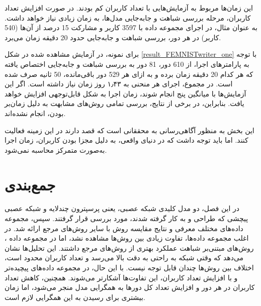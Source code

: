 این زمان‌ها مربوط به آزمایش‌هایی با تعداد کاربران کم بودند. در صورت افزایش تعداد کاربران، مرحله بررسی شباهت و جابه‌جایی مدل‌ها، به زمان زیادی نیاز خواهد داشت. به ‌عنوان مثال، در اجرای مجموعه داده
با 3597 کاربر و مشارکت 15 درصد از آن‌ها (540 کاربر) در هر دور، بررسی شباهت و جابه‌جایی حدود 20 دقیقه زمان می‌برد.

برای نمونه، در آزمایش مشاهده شده در شکل
\ref{result_FEMNISTwriter_one}
با توجه به پارامترهای اجرا، از 610 دور، 81 دور به بررسی شباهت و جابه‌جایی اختصاص یافته که هر کدام 20 دقیقه زمان برده و به ازای هر 529 دور باقی‌مانده، 50 ثانیه صرف شده است. در مجموع، اجرای هر منحنی به ۱٫۴۳ روز زمان نیاز داشته است. اگر این آزمایش‌ها با میانگین پنج
انجام شوند، زمان اجرا به شکل قابل‌توجهی افزایش خواهد یافت. بنابراین، در برخی از نتایج، بررسی تمامی روش‌های مشابهت به دلیل زمان‌بر بودن، انجام نشده‌اند.


این بخش به منظور آگاهی‌رسانی به محققانی است که قصد دارند در این زمینه فعالیت کنند. اما باید توجه داشت که در دنیای واقعی، به دلیل مجزا بودن کاربران، زمان اجرا به‌صورت متمرکز محاسبه نمی‌شود.


\section{جمع‌بندی}
در این فصل، دو مدل کلیدی شبکه عصبی، یعنی پرسپترون چندلایه
و شبکه عصبی پیچشی
که طراحی و به کار گرفته شدند، مورد بررسی قرار گرفتند. سپس، مجموعه داده‌های مختلف معرفی و نتایج مقایسه روش 
با سایر روش‌های مرجع ارائه شد. در اغلب مجموعه داده‌ها، تفاوت زیادی بین روش‌ها مشاهده نشد، اما در مجموعه داده 
%
، روش‌های مبتنی‌بر شباهت عملکرد بهتری از روش‌های مرجع داشتند. این تحلیل‌ها نشان می‌دهد که وقتی شبکه به راحتی به دقت بالا می‌رسد و تعداد کاربران محدود است، اختلاف بین روش‌ها چندان قابل توجه نیست. با این حال، در مجموعه داده‌های پیچیده‌تر و با افزایش تعداد کاربران، این تفاوت‌ها آشکارتر می‌شوند.
همچنین، کاهش تعداد کاربران در هر دور و افزایش تعداد کل دورها به همگرایی مدل منجر می‌شود، اما زمان بیشتری برای رسیدن به این همگرایی لازم است.
